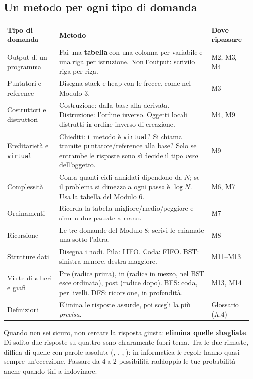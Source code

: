 \subsection*{Un metodo per ogni tipo di domanda}

\begin{center}\small
\begin{tabular}{p{3.4cm}p{6.6cm}p{2.6cm}}
\toprule
\textbf{Tipo di domanda} & \textbf{Metodo} & \textbf{Dove ripassare} \\
\midrule
Output di un programma & Fai una \textbf{tabella} con una colonna per variabile e
una riga per istruzione. Non \q{immaginare} l'output: scrivilo riga per riga. & M2, M3, M4 \\
Puntatori e reference & Disegna stack e heap con le frecce, come nel Modulo 3. & M3 \\
Costruttori e distruttori & Costruzione: dalla base alla derivata. Distruzione:
l'ordine inverso. Oggetti locali distrutti in ordine inverso di creazione. & M4, M9 \\
Ereditarietà e \texttt{virtual} & Chiediti: il metodo è \texttt{virtual}? Si chiama
tramite puntatore/reference alla base? Solo se entrambe le risposte sono sì decide il tipo
\emph{vero} dell'oggetto. & M9 \\
Complessità & Conta quanti cicli annidati dipendono da $N$; se il problema si dimezza a
ogni passo è $\log N$. Usa la tabella del Modulo 6. & M6, M7 \\
Ordinamenti & Ricorda la tabella migliore/medio/peggiore e simula due passate a mano. & M7 \\
Ricorsione & Le tre domande del Modulo 8; scrivi le chiamate una sotto l'altra. & M8 \\
Strutture dati & Disegna i nodi. Pila: LIFO. Coda: FIFO. BST: sinistra minore, destra
maggiore. & M11--M13 \\
Visite di alberi e grafi & Pre (radice prima), in (radice in mezzo, nel BST esce
ordinata), post (radice dopo). BFS: coda, per livelli. DFS: ricorsione, in profondità. & M13, M14 \\
Definizioni & Elimina le risposte assurde, poi scegli la più \emph{precisa}. & Glossario (A.4) \\
\bottomrule
\end{tabular}
\end{center}

\begin{consiglio}
Quando non sei sicuro, non cercare la risposta giusta: \textbf{elimina quelle
sbagliate}. Di solito due risposte su quattro sono chiaramente fuori tema. Tra le due
rimaste, diffida di quelle con parole assolute (, , ,
): in informatica le regole hanno quasi sempre un'eccezione. Passare da 4
a 2 possibilità raddoppia le tue probabilità anche quando tiri a indovinare.
\end{consiglio}

